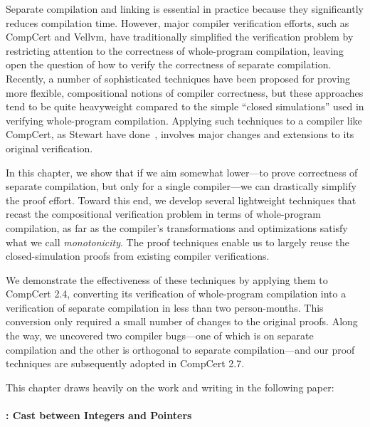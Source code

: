Separate compilation and linking is essential in practice because they significantly reduces
compilation time.  However, major compiler verification efforts, such as CompCert and Vellvm, have
traditionally simplified the verification problem by restricting attention to the correctness of
whole-program compilation, leaving open the question of how to verify the correctness of separate
compilation.  Recently, a number of sophisticated techniques have been proposed for proving more
flexible, compositional notions of compiler correctness, but these approaches tend to be quite
heavyweight compared to the simple ``closed simulations'' used in verifying whole-program
compilation.  Applying such techniques to a compiler like CompCert, as Stewart \etal{} have
done~\cite{compositional-compcert}, involves major changes and extensions to its original
verification.

In this chapter, we show that if we aim somewhat lower---to prove correctness of separate
compilation, but only for a single compiler---we can drastically simplify the proof effort.  Toward
this end, we develop several lightweight techniques that recast the compositional verification
problem in terms of whole-program compilation, as far as the compiler's transformations and
optimizations satisfy what we call \emph{monotonicity}.  The proof techniques enable us to largely
reuse the closed-simulation proofs from existing compiler verifications.

We demonstrate the effectiveness of these techniques by applying them to CompCert 2.4, converting
its verification of whole-program compilation into a verification of separate compilation in less
than two person-months.  This conversion only required a small number of changes to the original
proofs.  Along the way, we uncovered two compiler bugs---one of which is on separate compilation and
the other is orthogonal to separate compilation---and our proof techniques are subsequently adopted
in CompCert 2.7.

This chapter draws heavily on the work and writing in the following paper:


\paragraph{: Cast between Integers and Pointers}

